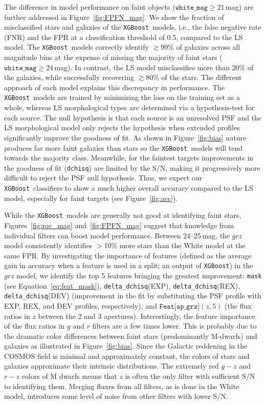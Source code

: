 \documentclass[twocolumn]{aastex631}
\newcommand{\xgboost}{\texttt{XGBoost}}
\begin{document}
\begin{CJK*}{UTF8}{gbsn}
The difference in model performance on faint objects ($\texttt{white\_mag}\ge21$\,mag) are further addressed in Figure~\ref{fig:FPFN_mag}. We show the fraction of misclassified stars and galaxies of the \xgboost\ models, i.e., the false negative rate (FNR) and the FPR at a classification threshold of 0.5, compared to the LS model. The \xgboost\ models correctly identify $\gtrsim$99\% of galaxies across all magnitude bins at the expense of missing the majority of faint stars ($\texttt{white\_mag}\ge24$\,mag). In contrast, the LS model misclassifies more than 20\% of the galaxies, while successfully recovering $\gtrsim$80\% of the stars. The different approach of each model explains this discrepancy in performance. The \xgboost\ models are trained by minimizing the loss on the training set as a whole, whereas LS morphological types are determined via a hypothesis-test for each source. The null hypothesis is that each source is an unresolved PSF and the LS morphological model only rejects the hypothesis when extended profiles significantly improve the goodness of fit. As shown in Figure~\ref{fig:bias} nature produces far more faint galaxies than stars so the \xgboost\ models will tend towards the majority class. Meanwhile, for the faintest targets improvements in the goodness of fit (\texttt{dchisq}) are limited by the S/N, making it progressively more difficult to reject the PSF null hypothesis. Thus, we expect our \xgboost\ classifiers to show a much higher overall accuracy compared to the LS model, especially for faint targets (see Figure~\ref{fig:acc}).

While the \xgboost\ models are generally not good at identifying faint stars, Figures~\ref{fig:roc_mag} and~\ref{fig:FPFN_mag} suggest that knowledge from individual filters can boost model performance. Between 24--25\,mag, the $grz$ model consistently identifies $>$10\% more stars than the White model at the same FPR. By investigating the importance of features (defined as the average gain in accuracy when a feature is used in a split; an output of \xgboost) in the $grz$ model, we identify the top 5 features bringing the greatest improvement: \texttt{mask} (see Equation~\ref{eq:feat_mask}), \texttt{delta\_dchisq}(EXP), \texttt{delta\_dchisq}(REX), \texttt{delta\_dchisq}(DEV) (improvement in the fit by substituting the PSF profile with EXP, REX, and DEV profiles, respectively), and $\texttt{Feat[ap\_grz]}(z, 5)$ (the flux ratios in $z$ between the 2 and 3 apertures). Interestingly, the feature importance of the flux ratios in $g$ and $r$ filters are a few times lower. This is probably due to the dramatic color differences between faint stars (predominantly M-dwarfs) and galaxies as illustrated in Figure~\ref{fig:bias}. Since the Galactic reddening in the COSMOS field is minimal and approximately constant, the colors of stars and galaxies approximate their intrinsic distributions. The extremely red $g-z$ and $r-z$ colors of M dwarfs means that $z$ is often the only filter with sufficient S/N to identifying them. Merging fluxes from all filters, as is done in the White model, introduces some level of noise from other filters with lower S/N.


\end{CJK*}
\end{document}
